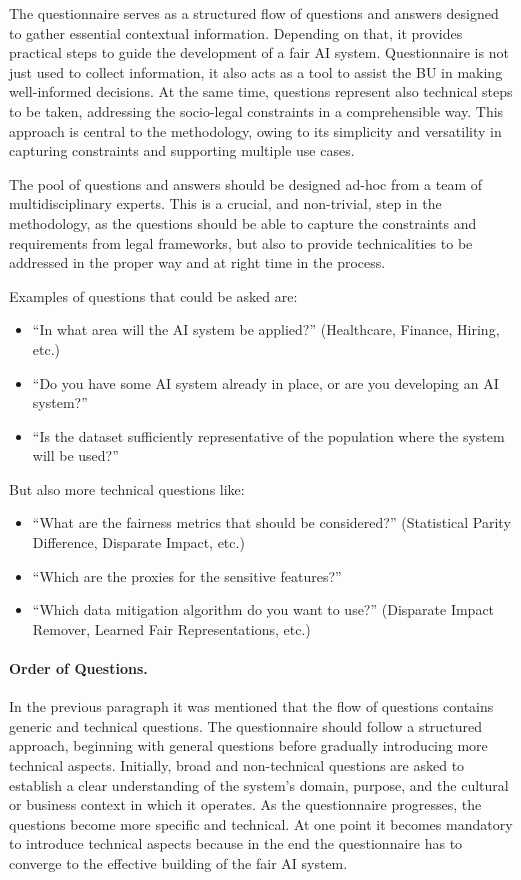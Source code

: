 \documentclass[12pt,a4paper,openright,twoside]{book}
\begin{document}
The questionnaire serves as a structured flow of questions and answers designed to gather essential contextual information. Depending on that, it provides practical steps to guide the development of a fair \ac{AI} system.
%
Questionnaire is not just used to collect information, it also acts as a tool to assist the \ac{BU} in making well-informed decisions. At the same time, questions represent also technical steps to be taken, addressing the socio-legal constraints in a comprehensible way.
%
This approach is central to the methodology, owing to its simplicity and versatility in capturing constraints and supporting multiple use cases.

The pool of questions and answers should be designed ad-hoc from a team of multidisciplinary experts. 
%
This is a crucial, and non-trivial, step in the methodology, as the questions should be able to capture the constraints and requirements from legal frameworks, but also to provide technicalities to be addressed in the proper way and at right time in the process.

Examples of questions that could be asked are:
\begin{itemize}
    \item ``In what area will the \ac{AI} system be applied?'' (Healthcare, Finance, Hiring, etc.)
    \item ``Do you have some AI system already in place, or are you developing an AI system?''
    \item ``Is the dataset sufficiently representative of the population where the system will be used?''
\end{itemize}
%
But also more technical questions like:
\begin{itemize}
    \item ``What are the fairness metrics that should be considered?'' (Statistical Parity Difference, Disparate Impact, etc.)
    \item ``Which are the proxies for the sensitive features?''
    \item ``Which data mitigation algorithm do you want to use?'' (Disparate Impact Remover, Learned Fair Representations, etc.)
\end{itemize}


\paragraph{Order of Questions.}
In the previous paragraph it was mentioned that the flow of questions contains generic and technical questions.
%
The questionnaire should follow a structured approach, beginning with general questions before gradually introducing more technical aspects.
%
Initially, broad and non-technical questions are asked to establish a clear understanding of the system’s domain, purpose, and the cultural or business context in which it operates.
%
As the questionnaire progresses, the questions become more specific and technical.
%
At one point it becomes mandatory to introduce technical aspects because in the end the questionnaire has to converge to the effective building of the fair \ac{AI} system.
\end{document}
